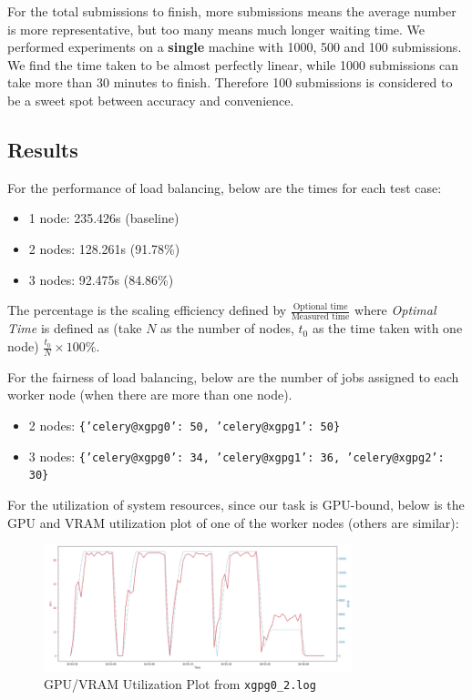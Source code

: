 For the total submissions to finish, more submissions means the average number is more representative, but too many means much longer waiting time. We performed experiments on a \textbf{single} machine with 1000, 500 and 100 submissions. We find the time taken to be almost perfectly linear, while 1000 submissions can take more than 30 minutes to finish. Therefore 100 submissions is considered to be a sweet spot between accuracy and convenience.

\subsection{Results}
\label{ss:load-balancing-exp-results}

For the performance of load balancing, below are the times for each test case:
\begin{itemize}
    \item 1 node: 235.426s (baseline)
    \item 2 nodes: 128.261s (91.78\%)
    \item 3 nodes: 92.475s (84.86\%)
\end{itemize}
The percentage is the scaling efficiency defined by $\frac{\text{Optional time}}{\text{Measured time}}$ where \emph{Optimal Time} is defined as (take $N$ as the number of nodes, $t_0$ as the time taken with one node) $\frac{t_0}{N} \times 100\%$.

For the fairness of load balancing, below are the number of jobs assigned to each worker node (when there are more than one node).
\begin{itemize}
    \item 2 nodes: \texttt{\{'celery@xgpg0': 50, 'celery@xgpg1': 50\}}
    \item 3 nodes: \texttt{\{'celery@xgpg0': 34, 'celery@xgpg1': 36, 'celery@xgpg2': 30\}}
\end{itemize}

For the utilization of system resources, since our task is GPU-bound, below is the GPU and VRAM utilization plot of one of the worker nodes (others are similar):

\begin{figure}[H]
    \centering
    \includegraphics[width=0.8\textwidth]{images/experiment-lb-utilization-plot.png}
    \caption{GPU/VRAM Utilization Plot from \texttt{xgpg0\_2.log}}
    \label{fig:experiment-lb-utilization-plot}
\end{figure}

